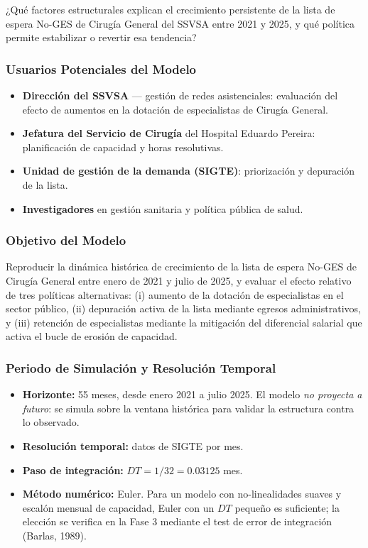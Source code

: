 \documentclass[12pt,a4paper]{article}
\begin{document}
\begin{tcolorbox}[colback=azulDS!5,colframe=azulDS!60]
¿Qué factores estructurales explican el crecimiento persistente de la lista de espera No-GES de Cirugía General del SSVSA entre 2021 y 2025, y qué política permite estabilizar o revertir esa tendencia?
\end{tcolorbox}

\subsubsection*{Usuarios Potenciales del Modelo}

\begin{itemize}[leftmargin=1.5cm]
  \item \textbf{Dirección del SSVSA} — gestión de redes asistenciales: evaluación del efecto de aumentos en la dotación de especialistas de Cirugía General.
  \item \textbf{Jefatura del Servicio de Cirugía} del Hospital Eduardo Pereira: planificación de capacidad y horas resolutivas.
  \item \textbf{Unidad de gestión de la demanda (SIGTE)}: priorización y depuración de la lista.
  \item \textbf{Investigadores} en gestión sanitaria y política pública de salud.
\end{itemize}

\subsubsection*{Objetivo del Modelo}

Reproducir la dinámica histórica de crecimiento de la lista de espera No-GES de Cirugía General entre enero de 2021 y julio de 2025, y evaluar el efecto relativo de tres políticas alternativas: (i) aumento de la dotación de especialistas en el sector público, (ii) depuración activa de la lista mediante egresos administrativos, y (iii) retención de especialistas mediante la mitigación del diferencial salarial que activa el bucle de erosión de capacidad.

\subsubsection*{Periodo de Simulación y Resolución Temporal}

\begin{itemize}[leftmargin=1.5cm]
  \item \textbf{Horizonte:} 55 meses, desde enero 2021 a julio 2025. El modelo \emph{no proyecta a futuro}: se simula sobre la ventana histórica para validar la estructura contra lo observado.
  \item \textbf{Resolución temporal:} datos de SIGTE por mes.
  \item \textbf{Paso de integración:} $DT = 1/32 = 0.03125$ mes.
  \item \textbf{Método numérico:} Euler. Para un modelo con no-linealidades suaves y escalón mensual de capacidad, Euler con un $DT$ pequeño es suficiente; la elección se verifica en la Fase 3 mediante el test de error de integración (Barlas, 1989).
\end{itemize}
\end{document}
